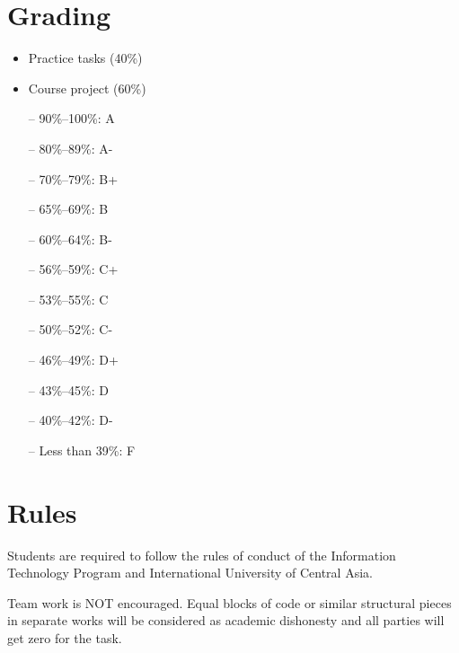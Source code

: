 \documentclass[12pt,a4paper,oneside]{article}
\begin{document}
    \section{Grading}

        \begin{itemize}
            \item Practice tasks (40\%)
            \item Course project (60\%)
        \end{itemize}

        \begin{itemize} \itemsep-10pt \parskip0pt 
            \item[--] 90\%--100\%: A\\
            \item[--] 80\%--89\%: A-\\
            \item[--] 70\%--79\%: B+\\
            \item[--] 65\%--69\%: B\\
            \item[--] 60\%--64\%: B-\\
            \item[--] 56\%--59\%: C+\\
            \item[--] 53\%--55\%: C\\
            \item[--] 50\%--52\%: C-\\
            \item[--] 46\%--49\%: D+\\
            \item[--] 43\%--45\%: D\\
            \item[--] 40\%--42\%: D-\\
            \item[--] Less than 39\%: F
        \end{itemize}

    \section{Rules}

        Students are required to follow the rules of conduct of the Information Technology Program and International University of Central Asia.

        Team work is NOT encouraged. Equal blocks of code or similar structural
        pieces in separate works will be considered as academic dishonesty and
        all parties will get zero for the task.
\end{document}
